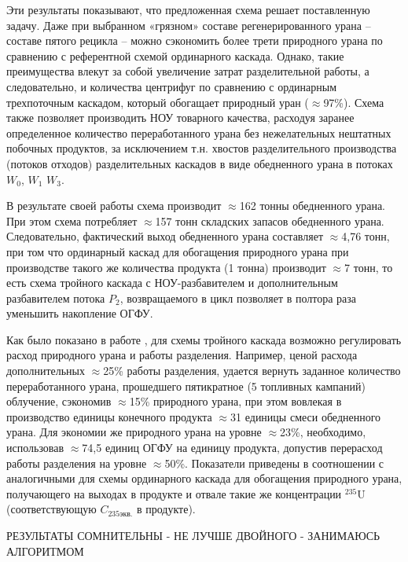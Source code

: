 Эти результаты показывают, что предложенная схема решает поставленную задачу. Даже при выбранном «грязном» составе регенерированного урана -- составе пятого рецикла -- можно сэкономить более трети природного урана  по сравнению с референтной схемой ординарного каскада. Однако, такие преимущества влекут за собой увеличение затрат разделительной работы, а следовательно, и количества центрифуг по сравнению с ординарным трехпоточным каскадом, который обогащает природный уран ($\approx$97\%). Схема также позволяет производить НОУ товарного качества, расходуя заранее определенное количество переработанного урана без нежелательных нештатных побочных продуктов, за исключением т.н. хвостов разделительного производства (потоков отходов) разделительных каскадов в виде обедненного урана в потоках $W_0$, $W_1$ $W_3$.

В результате своей работы схема производит $\approx$162 тонны обедненного урана. При этом схема потребляет $\approx$157 тонн складских запасов обедненного урана. Следовательно, фактический выход обедненного урана составляет $\approx$4,76 тонн, при том что ординарный каскад для обогащения природного урана при производстве такого же количества продукта (1 тонна) производит $\approx$7 тонн, то есть схема тройного каскада с НОУ-разбавителем и дополнительным разбавителем потока $P_2$, возвращаемого в цикл позволяет в полтора раза уменьшить накопление ОГФУ.


Как было показано в работе \cite{gusevMultycascadeEnrichmentSchemes2020}, для схемы тройного каскада возможно регулировать расход природного урана и работы разделения. Например, ценой расхода дополнительных $\approx$25\% работы разделения, удается вернуть заданное количество переработанного урана, прошедшего пятикратное (5 топливных кампаний) облучение, сэкономив $\approx$15\% природного урана, при этом вовлекая в производство единицы конечного продукта $\approx$31 единицы смеси обедненного урана. Для экономии же природного урана на уровне $\approx$23\%, необходимо, использовав $\approx$74,5 единиц ОГФУ на единицу продукта, допустив перерасход работы разделения на уровне $\approx$50\%. Показатели приведены в соотношении с аналогичными для схемы ординарного каскада для обогащения природного урана, получающего на выходах в продукте и отвале такие же концентрации $^{235}$U (соответствующую $C_{235 экв.}$ в продукте).




РЕЗУЛЬТАТЫ СОМНИТЕЛЬНЫ - НЕ ЛУЧШЕ ДВОЙНОГО - ЗАНИМАЮСЬ АЛГОРИТМОМ




